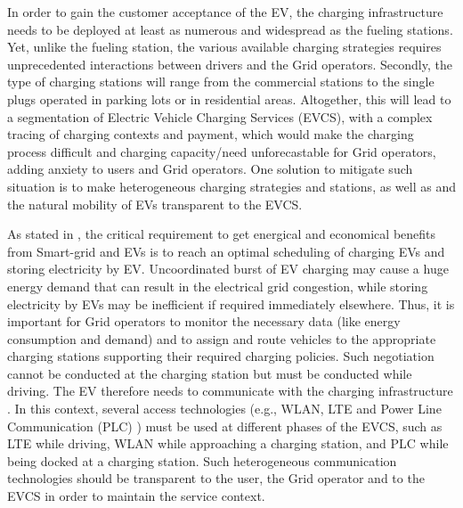 In order to gain the customer acceptance of the EV, the charging infrastructure needs to be deployed at least as numerous and widespread as the fueling stations. Yet, unlike the fueling station, the various available charging strategies requires unprecedented interactions between drivers and the Grid operators. Secondly, the type of charging stations will range from the commercial stations to the single plugs operated in parking lots or in residential areas. Altogether, this will lead to a segmentation of Electric Vehicle Charging Services (EVCS), with a complex tracing of charging contexts and payment, which would make the charging process difficult and charging capacity/need unforecastable for Grid operators, adding anxiety to users and Grid operators. One solution to mitigate such situation is to make heterogeneous charging strategies and stations, as well as  and the natural mobility of EVs transparent to the EVCS. 

As stated in \cite{EV_smart_grid}, the critical requirement to get energical and economical benefits from Smart-grid and EVs is to reach an optimal scheduling of charging EVs and storing electricity by EV. 
Uncoordinated burst of EV charging may cause a huge energy demand that can result in the electrical grid congestion, while storing electricity by EVs may be inefficient if required immediately elsewhere. Thus, it is important for Grid operators to monitor the necessary data (like energy consumption and demand) and to assign and route vehicles to the appropriate charging stations supporting their required charging policies. Such negotiation cannot be conducted at the charging station but must be conducted while driving. The EV therefore needs to communicate with the charging infrastructure \cite{plc_smart_grid}. In this context, several access technologies (e.g., WLAN, LTE and Power Line Communication (PLC) \cite{wireless_plc}\cite{plc_full}) must be used at different phases of the EVCS, such as LTE while driving, WLAN while approaching a charging station, and PLC while being docked at a charging station. Such heterogeneous communication technologies should be transparent to the user, the Grid operator and to the EVCS in order to maintain the service context. 

